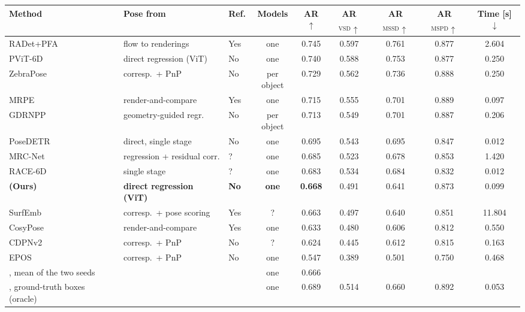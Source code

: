 \begin{table}[t]
  \centering
  \small
  \begin{tabular}{lllcccccc}
    \toprule
    Method & Pose from & Ref. & Models & AR$\uparrow$ & AR$_\mathrm{VSD}\uparrow$ &
    AR$_\mathrm{MSSD}\uparrow$ & AR$_\mathrm{MSPD}\uparrow$ & Time [s]$\downarrow$ \\
    \midrule
    RADet+PFA~\cite{hai2023radet,hu2022pfa} & flow to renderings & Yes & one & 0.745 & 0.597 & 0.761 & 0.877 & 2.604 \\
    PViT-6D~\cite{stapf2023pvit6d} & direct regression (ViT) & No & one & 0.740 & 0.588 & 0.753 & 0.877 & 0.250 \\
    ZebraPose~\cite{su2022zebrapose} & corresp.\ + PnP & No & per object & 0.729 & 0.562 & 0.736 & 0.888 & 0.250 \\
    MRPE~\cite{bop_mrpe} & render-and-compare & Yes & one & 0.715 & 0.555 & 0.701 & 0.889 & 0.097 \\
    GDRNPP~\cite{liu2022gdrnpp} & geometry-guided regr. & No & per object & 0.713 & 0.549 & 0.701 & 0.887 & 0.206 \\
    PoseDETR~\cite{bop_posedetr} & direct, single stage & No & one & 0.695 & 0.543 & 0.695 & 0.847 & 0.012 \\
    MRC-Net~\cite{li2024mrcnet} & regression + residual corr. & ? & one & 0.685 & 0.523 & 0.678 & 0.853 & 1.420 \\
    RACE-6D~\cite{ha2026race6d} & single stage & ? & one & 0.683 & 0.534 & 0.684 & 0.832 & 0.012 \\
    \textbf{\ours{} (Ours)} & \textbf{direct regression (ViT)} & \textbf{No} & \textbf{one} & \textbf{0.668} & 0.491 & 0.641 & 0.873 & 0.099 \\
    SurfEmb~\cite{haugaard2022surfemb} & corresp.\ + pose scoring & Yes & ? & 0.663 & 0.497 & 0.640 & 0.851 & 11.804 \\
    CosyPose~\cite{labbe2020cosypose} & render-and-compare & Yes & one & 0.633 & 0.480 & 0.606 & 0.812 & 0.550 \\
    CDPNv2~\cite{li2019cdpn} & corresp.\ + PnP & No & ? & 0.624 & 0.445 & 0.612 & 0.815 & 0.163 \\
    EPOS~\cite{hodan2020epos} & corresp.\ + PnP & No & one & 0.547 & 0.389 & 0.501 & 0.750 & 0.468 \\
    \midrule
    \ours{}, mean of the two seeds & & & one & 0.666 & & & & \\
    \ours{}, ground-truth boxes (oracle) & & & one & 0.689 & 0.514 & 0.660 & 0.892 & 0.053 \\

\end{tabular}
\end{table}
